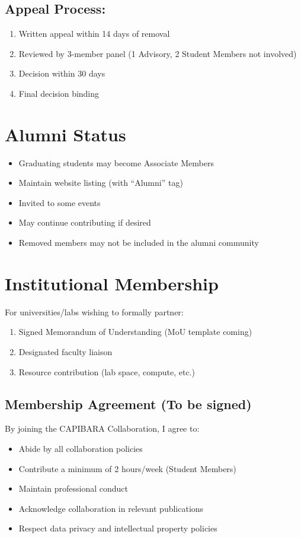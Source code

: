 \documentclass[11pt,a4paper]{article}
\begin{document}
\subsection{Appeal Process:}
\begin{enumerate}
\item Written appeal within 14 days of removal
\item Reviewed by 3-member panel (1 Advisory, 2 Student Members not involved)
\item Decision within 30 days
\item Final decision binding
\end{enumerate}

\section{Alumni Status}
\begin{itemize}
\item Graduating students may become Associate Members
\item Maintain website listing (with ``Alumni'' tag)
\item Invited to some events
\item May continue contributing if desired
\item Removed members may not be included in the alumni community
\end{itemize}

\section{Institutional Membership}
For universities/labs wishing to formally partner:
\begin{enumerate}
\item Signed Memorandum of Understanding (MoU template coming)
\item Designated faculty liaison
\item Resource contribution (lab space, compute, etc.)
\end{enumerate}

\hrulefill

\subsection*{Membership Agreement (To be signed)}

By joining the CAPIBARA Collaboration, I agree to:
\begin{itemize}
\item Abide by all collaboration policies
\item Contribute a minimum of 2 hours/week (Student Members)
\item Maintain professional conduct
\item Acknowledge collaboration in relevant publications
\item Respect data privacy and intellectual property policies
\end{itemize}
\end{document}
